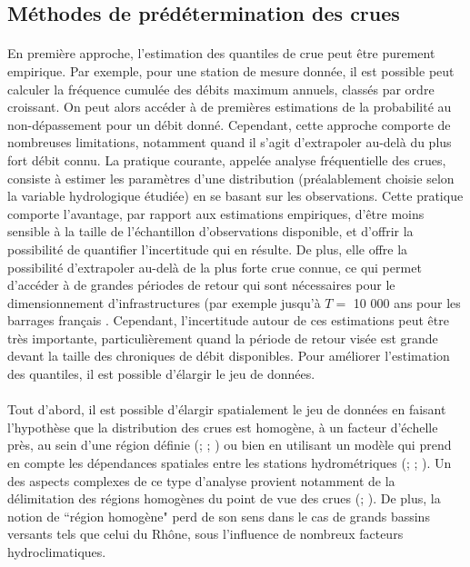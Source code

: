 \documentclass[11pt]{article}
\begin{document}
	\subsection{Méthodes de prédétermination des crues}
	
\label{subsec:méthodes}	
	\paragraph{} En première approche, l'estimation des quantiles de crue peut être purement empirique. Par exemple, pour une station de mesure donnée, il est possible peut calculer la fréquence cumulée des débits maximum annuels, classés par ordre croissant. On peut alors accéder à de premières estimations de la probabilité au non-dépassement pour un débit donné. Cependant, cette approche comporte de nombreuses limitations, notamment quand il s'agit d'extrapoler au-delà du plus fort débit connu. La pratique courante, appelée analyse fréquentielle des crues, consiste à estimer les paramètres d'une distribution (préalablement choisie selon la variable hydrologique étudiée) en se basant sur les observations. Cette pratique comporte l'avantage, par rapport aux estimations empiriques, d'être moins sensible à la taille de l'échantillon d'observations disponible, et d'offrir la possibilité de quantifier l'incertitude qui en résulte. De plus, elle offre la possibilité d'extrapoler au-delà de la plus forte crue connue, ce qui permet d'accéder à de grandes périodes de retour qui sont nécessaires pour le dimensionnement d'infrastructures (par exemple jusqu'à $T =$ 10 000 ans pour les barrages français \citep{le_delliou_recommandations_2014}. Cependant, l'incertitude autour de ces estimations peut être très importante, particulièrement quand la période de retour visée est grande devant la taille des chroniques de débit disponibles. Pour améliorer l'estimation des quantiles, il est possible d'élargir le jeu de données. 
	
	\paragraph{} Tout d'abord, il est possible d'élargir spatialement le jeu de données en faisant l'hypothèse que la distribution des crues est homogène, à un facteur d'échelle près, au sein d'une région définie (\citet{hosking_regional_1997}; \citet{gaume_bayesian_2010}; \citet{viglione_flood_2013}) ou bien en utilisant un modèle qui prend en compte les dépendances spatiales entre les stations hydrométriques (\citet{kjeldsen_exploratory_2009}; \citet{renard_bayesian_2011}; \citet{sun_general_2014}). Un des aspects complexes de ce type d'analyse provient notamment de la délimitation des régions homogènes du point de vue des crues (\citet{ouarda_regional_2001}; \citet{han_network_2020}). De plus, la notion de ``région homogène" perd de son sens dans le cas de grands bassins versants tels que celui du Rhône, sous l'influence de nombreux facteurs hydroclimatiques.  
	
\end{document}
